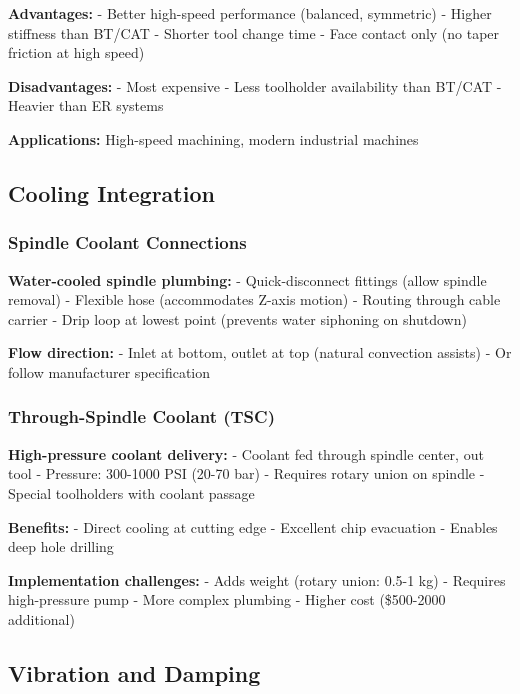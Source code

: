 \documentclass[
]{article}
\begin{document}
\textbf{Advantages:} - Better high-speed performance (balanced,
symmetric) - Higher stiffness than BT/CAT - Shorter tool change time -
Face contact only (no taper friction at high speed)

\textbf{Disadvantages:} - Most expensive - Less toolholder availability
than BT/CAT - Heavier than ER systems

\textbf{Applications:} High-speed machining, modern industrial machines

\subsection{Cooling Integration}\label{cooling-integration}

\subsubsection{Spindle Coolant
Connections}\label{spindle-coolant-connections}

\textbf{Water-cooled spindle plumbing:} - Quick-disconnect fittings
(allow spindle removal) - Flexible hose (accommodates Z-axis motion) -
Routing through cable carrier - Drip loop at lowest point (prevents
water siphoning on shutdown)

\textbf{Flow direction:} - Inlet at bottom, outlet at top (natural
convection assists) - Or follow manufacturer specification

\subsubsection{Through-Spindle Coolant
(TSC)}\label{through-spindle-coolant-tsc}

\textbf{High-pressure coolant delivery:} - Coolant fed through spindle
center, out tool - Pressure: 300-1000 PSI (20-70 bar) - Requires rotary
union on spindle - Special toolholders with coolant passage

\textbf{Benefits:} - Direct cooling at cutting edge - Excellent chip
evacuation - Enables deep hole drilling

\textbf{Implementation challenges:} - Adds weight (rotary union: 0.5-1
kg) - Requires high-pressure pump - More complex plumbing - Higher cost
(\$500-2000 additional)

\subsection{Vibration and Damping}\label{vibration-and-damping}
\end{document}
